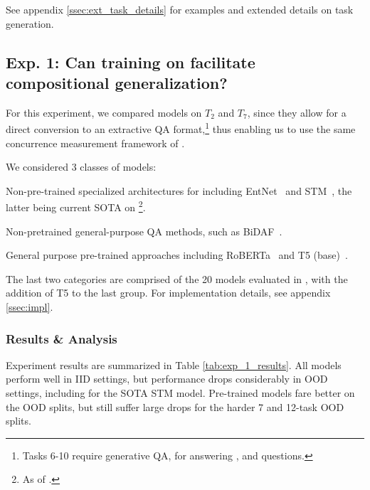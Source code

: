 See appendix \ref{ssec:ext_task_details} for examples and extended details on task generation.

\subsection{Exp. 1: Can training on \babibm facilitate compositional generalization?} 





For this experiment, we compared models on $T_2$ and $T_7$, since they allow for a direct conversion to an extractive QA format,\footnote{Tasks 6-10 require generative QA, for answering \yesno, \countq and \listq questions.} thus enabling us to use the same concurrence measurement framework of \citet{liu2021small}.










 We considered 3 classes of models: 
\begin{compactitem}
    \item  Non-pre-trained specialized architectures for \babibm including EntNet~\citep{entnet2017} and STM~\citep{le2020self}, the latter being current SOTA on \babibm\footnote{As of \writingdate.}.
    \item  Non-pretrained general-purpose QA methods, such as BiDAF~\citep{seo2016bidirectional}.
    \item General purpose pre-trained approaches including RoBERTa~\citep{liu2020roberta} and T5 (base)~\citep{2020t5}.
\end{compactitem}

The last two categories are comprised of the 20 models evaluated in \citet{liu2021small}, with the addition of T5 to the last group. For implementation details, see appendix \ref{ssec:impl}.


\subsubsection*{Results \& Analysis} 
\label{ssec:4_1_analysis}
Experiment results are summarized in Table \ref{tab:exp_1_results}. All models perform well in IID settings, but performance drops considerably in OOD settings, including for the SOTA STM model. Pre-trained models fare better on the OOD splits, but still suffer large drops for the harder 7 and 12-task OOD splits. 




